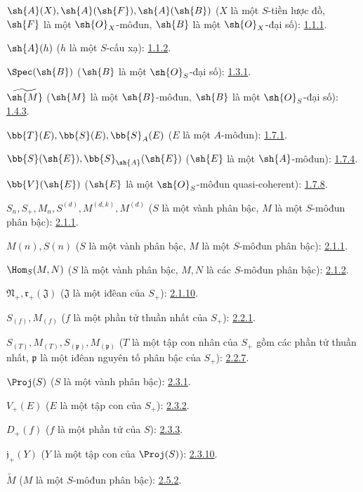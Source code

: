 \documentclass[oneside,10pt]{amsart}
\begin{document}
\begingroup
\small
\setlength{\parindent}{0pt}
\setlength{\parskip}{2pt}

$\sh{A}(X),\sh{A}(\sh{F}),\sh{A}(\sh{B})$
($X$ là một $S$-tiền lược đồ, $\sh{F}$ là một $\sh{O}_X$-môđun,
$\sh{B}$ là một $\sh{O}_X$-đại số): \hyperref[II.1.1.1]{1.1.1}.

$\sh{A}(h)$ ($h$ là một $S$-cấu xạ): \hyperref[II.1.1.2]{1.1.2}.

$\Spec(\sh{B})$ ($\sh{B}$ là một $\sh{O}_S$-đại số): \hyperref[II.1.3.1]{1.3.1}.

$\widetilde{\sh{M}}$ ($\sh{M}$ là một $\sh{B}$-môđun,
$\sh{B}$ là một $\sh{O}_S$-đại số): \hyperref[II.1.4.3]{1.4.3}.

$\bb{T}(E),\bb{S}(E),\bb{S}_A(E)$ ($E$ là một $A$-môđun): \hyperref[II.1.7.1]{1.7.1}.

$\bb{S}(\sh{E}),\bb{S}_{\sh{A}}(\sh{E})$
($\sh{E}$ là một $\sh{A}$-môđun): \hyperref[II.1.7.4]{1.7.4}.

$\bb{V}(\sh{E})$ ($\sh{E}$ là một $\sh{O}_S$-môđun quasi-coherent): \hyperref[II.1.7.8]{1.7.8}.

$S_n,S_+,M_n,S^{(d)},M^{(d,k)},M^{(d)}$
($S$ là một vành phân bậc, $M$ là một $S$-môđun phân bậc): \hyperref[II.2.1.1]{2.1.1}.

$M(n),S(n)$ ($S$ là một vành phân bậc, $M$ là một $S$-môđun phân bậc): \hyperref[II.2.1.1]{2.1.1}.

$\Hom_S(M,N)$ ($S$ là một vành phân bậc, $M,N$ là các $S$-môđun phân bậc): \hyperref[II.2.1.2]{2.1.2}.

$\mathfrak N_+,\mathfrak r_+(\mathfrak J)$
($\mathfrak J$ là một iđêan của $S_+$): \hyperref[II.2.1.10]{2.1.10}.

$S_{(f)},M_{(f)}$ ($f$ là một phần tử thuần nhất của $S_+$): \hyperref[II.2.2.1]{2.2.1}.

$S_{(T)},M_{(T)},S_{(\mathfrak p)},M_{(\mathfrak p)}$
($T$ là một tập con nhân của $S_+$ gồm các phần tử thuần nhất,
$\mathfrak p$ là một iđêan nguyên tố phân bậc của $S_+$): \hyperref[II.2.2.7]{2.2.7}.

$\Proj(S)$ ($S$ là một vành phân bậc): \hyperref[II.2.3.1]{2.3.1}.

$V_+(E)$ ($E$ là một tập con của $S_+$): \hyperref[II.2.3.2]{2.3.2}.

$D_+(f)$ ($f$ là một phần tử của $S$): \hyperref[II.2.3.3]{2.3.3}.

$\mathfrak j_+(Y)$ ($Y$ là một tập con của $\Proj(S)$): \hyperref[II.2.3.10]{2.3.10}.

$\widetilde M$ ($M$ là một $S$-môđun phân bậc): \hyperref[II.2.5.2]{2.5.2}.
\end{document}
